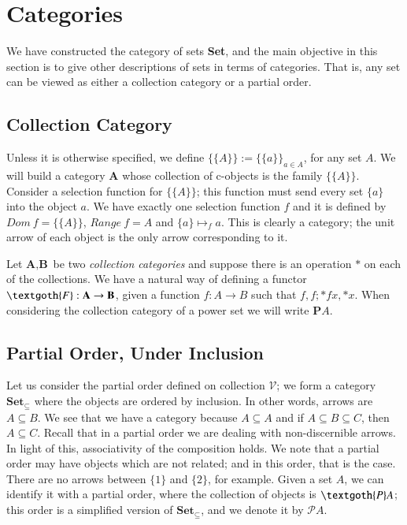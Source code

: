 \documentclass [12pt]{book}
\begin{document}
	\section{Categories}

We have constructed the category of sets \textbf{Set}, and the main objective in this section is to give other descriptions of sets in terms of categories. That is, any set can be viewed as either a collection category or a partial order.

\subsection{Collection Category}

Unless it is otherwise specified, we define $\{\{A\}\}:=\{\{a\}\}_{a\in A}$, for any set $A$. We will build a category $\textbf{A}$ whose collection of c-objects is the family $\{\{A\}\}$. Consider a selection function for $\{\{A\}\}$; this function must send every set $\{a\}$ into the object $a$. We have exactly one selection function $f$ and it is defined by $Dom~f=\{\{A\}\}$, $Range~f=A$ and $\{a\}\mapsto_fa$. This is clearly a category; the unit arrow of each object is the only arrow corresponding to it.

Let $\textbf{A},\textbf{B}$ be two \textit{collection categories} and suppose there is an operation $*$ on each of the collections. We have a natural way of defining a functor $\textgoth{F}:\textbf{A}\rightarrow\textbf{B}$, given a function $f:A\rightarrow B$ such that $f,f;*fx,*x$. When considering the collection category of a power set we will write $\textbf{P}A$.

\subsection{Partial Order, Under Inclusion}

Let us consider the partial order defined on collection $\mathcal{V}$; we form a category $\textbf{Set}_{\subseteq}$ where the objects are ordered by inclusion. In other words, arrows are $A\subseteq B$. We see that we have a category because $A\subseteq A$ and if $A\subseteq B\subseteq C$, then $A\subseteq C$. Recall that in a partial order we are dealing with non-discernible arrows. In light of this, associativity of the composition holds. We note that a partial order may have objects which are not related; and in this order, that is the case. There are no arrows between $\{1\}$ and $\{2\}$, for example. Given a set $A$, we can identify it with a partial order, where the collection of objects is $\textgoth{P}A$; this order is a simplified version of $\textbf{Set}_{\subseteq}$, and we denote it by $\mathcal{P}A$.
\end{document}
